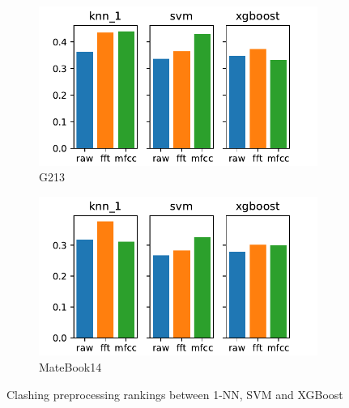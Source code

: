 \documentclass[../main.tex]{subfiles}
\begin{document}
\begin{figure}
    \centering
    \begin{subfigure}[b]{0.49\textwidth}
        \includegraphics[width=\textwidth]{figures/plots/model_comparison/custom_knn_1_xgboost_svm_g213.pdf}
        \caption{G213}
        \label{fig:selective_model_comparison_knn_xgboost_svm_g213}
    \end{subfigure}
    \begin{subfigure}[b]{0.49\textwidth}
        \includegraphics[width=\textwidth]{figures/plots/model_comparison/custom_knn_1_xgboost_svm_matebook14.pdf}
        \caption{MateBook14}
        \label{fig:selective_model_comparison_knn_xgboost_svm_matebook14}
    \end{subfigure}
    \caption{Clashing preprocessing rankings between 1-NN, SVM and XGBoost}
\end{figure}
\end{document}
